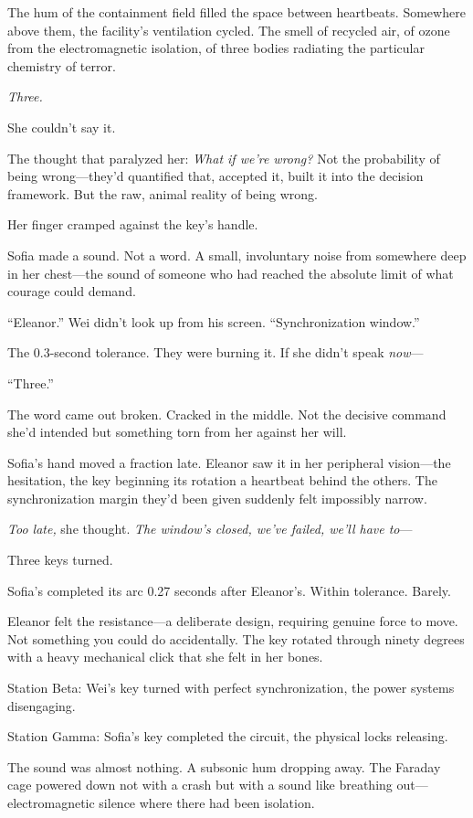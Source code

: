 The hum of the containment field filled the space between heartbeats. Somewhere above them, the facility's ventilation cycled. The smell of recycled air, of ozone from the electromagnetic isolation, of three bodies radiating the particular chemistry of terror.

\emph{Three.}

She couldn't say it.

The thought that paralyzed her: \emph{What if we're wrong?} Not the probability of being wrong---they'd quantified that, accepted it, built it into the decision framework. But the raw, animal reality of being wrong.

Her finger cramped against the key's handle.

Sofia made a sound. Not a word. A small, involuntary noise from somewhere deep in her chest---the sound of someone who had reached the absolute limit of what courage could demand.

``Eleanor.'' Wei didn't look up from his screen. ``Synchronization window.''

The 0.3-second tolerance. They were burning it. If she didn't speak \emph{now}---

``Three.''

The word came out broken. Cracked in the middle. Not the decisive command she'd intended but something torn from her against her will.

Sofia's hand moved a fraction late. Eleanor saw it in her peripheral vision---the hesitation, the key beginning its rotation a heartbeat behind the others. The synchronization margin they'd been given suddenly felt impossibly narrow.

\emph{Too late,} she thought. \emph{The window's closed, we've failed, we'll have to}---

Three keys turned.

Sofia's completed its arc 0.27 seconds after Eleanor's. Within tolerance. Barely.

Eleanor felt the resistance---a deliberate design, requiring genuine force to move. Not something you could do accidentally. The key rotated through ninety degrees with a heavy mechanical click that she felt in her bones.

Station Beta: Wei's key turned with perfect synchronization, the power systems disengaging.

Station Gamma: Sofia's key completed the circuit, the physical locks releasing.

The sound was almost nothing. A subsonic hum dropping away. The Faraday cage powered down not with a crash but with a sound like breathing out---electromagnetic silence where there had been isolation.

